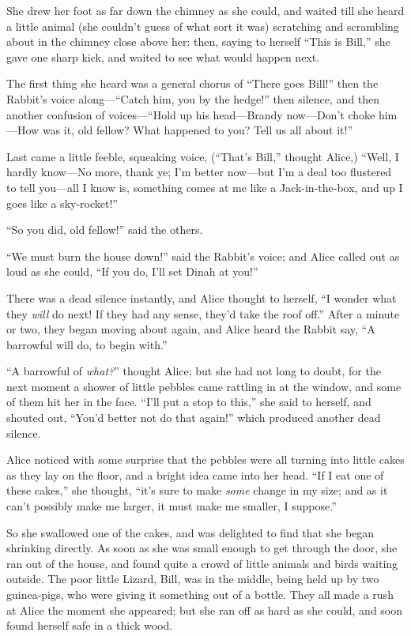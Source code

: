 \documentclass[book, 20pt]{extbook}
\begin{document}
She drew her foot as far down the chimney as she could, and waited till
she heard a little animal (she couldn't guess of what sort it was)
scratching and scrambling about in the chimney close above her: then,
saying to herself ``This is Bill,'' she gave one sharp kick, and waited
to see what would happen next.

The first thing she heard was a general chorus of ``There goes Bill!''
then the Rabbit's voice along---``Catch him, you by the hedge!'' then
silence, and then another confusion of voices---``Hold up his
head---Brandy now---Don't choke him---How was it, old fellow? What
happened to you? Tell us all about it!''

Last came a little feeble, squeaking voice, (``That's Bill,'' thought
Alice,) ``Well, I hardly know---No more, thank ye; I'm better now---but
I'm a deal too flustered to tell you---all I know is, something comes at
me like a Jack-in-the-box, and up I goes like a sky-rocket!''

``So you did, old fellow!'' said the others.

``We must burn the house down!'' said the Rabbit's voice; and Alice
called out as loud as she could, ``If you do, I'll set Dinah at you!''

There was a dead silence instantly, and Alice thought to herself, ``I
wonder what they \emph{will} do next! If they had any sense, they'd take
the roof off.'' After a minute or two, they began moving about again,
and Alice heard the Rabbit say, ``A barrowful will do, to begin with.''

``A barrowful of \emph{what?}'' thought Alice; but she had not long to
doubt, for the next moment a shower of little pebbles came rattling in
at the window, and some of them hit her in the face. ``I'll put a stop
to this,'' she said to herself, and shouted out, ``You'd better not do
that again!'' which produced another dead silence.

Alice noticed with some surprise that the pebbles were all turning into
little cakes as they lay on the floor, and a bright idea came into her
head. ``If I eat one of these cakes,'' she thought, ``it's sure to make
\emph{some} change in my size; and as it can't possibly make me larger,
it must make me smaller, I suppose.''

So she swallowed one of the cakes, and was delighted to find that she
began shrinking directly. As soon as she was small enough to get through
the door, she ran out of the house, and found quite a crowd of little
animals and birds waiting outside. The poor little Lizard, Bill, was in
the middle, being held up by two guinea-pigs, who were giving it
something out of a bottle. They all made a rush at Alice the moment she
appeared; but she ran off as hard as she could, and soon found herself
safe in a thick wood.
\end{document}

